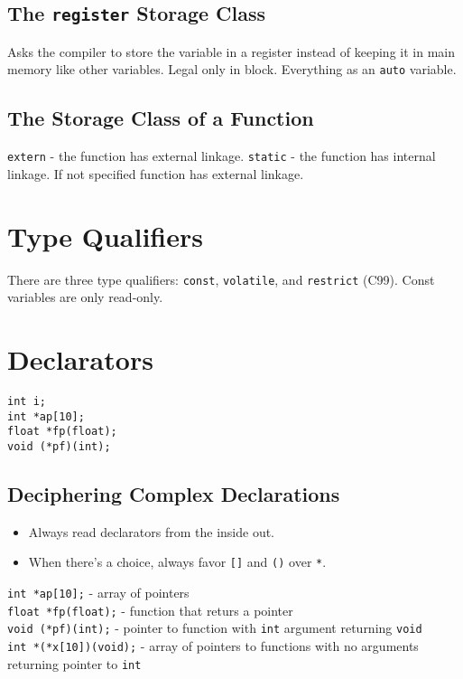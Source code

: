 \documentclass[openany]{book}
\begin{document}
    \subsection*{The \texttt{register} Storage Class}
    Asks the compiler to store the variable in a register instead of keeping it in main memory like other variables. Legal only in block. Everything as an \texttt{auto} variable.

    \subsection*{The Storage Class of a Function}
    \texttt{extern} - the function has external linkage. \texttt{static} - the function has internal linkage. If not specified function has external linkage.

    \section{Type Qualifiers}
    There are three type qualifiers: \texttt{const}, \texttt{volatile}, and \texttt{restrict} (C99). Const variables are only read-only. 

    \section{Declarators}
    \texttt{int i; \\
    int *ap[10]; \\
    float *fp(float); \\
    void (*pf)(int);}

    \subsection*{Deciphering Complex Declarations}
    \begin{itemize}
        \item Always read declarators from the inside out.
        \item When there's a choice, always favor \texttt{[]} and \texttt{()} over \texttt{*}.
    \end{itemize}

    \texttt{int *ap[10];} - array of pointers \\
    \texttt{float *fp(float);} - function that returs a pointer \\
    \texttt{void (*pf)(int);} - pointer to function with \texttt{int} argument returning \texttt{void} \\
    \texttt{int *(*x[10])(void);} - array of pointers to functions with no arguments returning pointer to \texttt{int}
\end{document}
